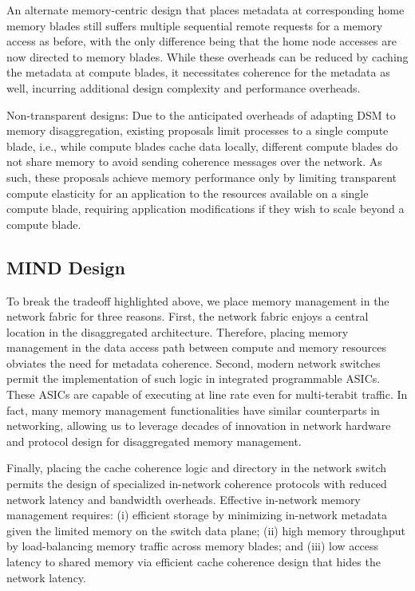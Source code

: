 An alternate memory-centric design that places metadata at corresponding home memory blades still suffers multiple sequential remote requests for a memory access as before, with the only difference being that the home node accesses are now directed to memory blades. While these overheads can be reduced by caching the metadata at compute blades, it necessitates coherence for the metadata as well, incurring additional design complexity and performance overheads.

Non-transparent designs: Due to the anticipated overheads of adapting DSM to memory disaggregation, existing proposals limit processes to a single compute blade, i.e., while compute blades cache data locally, different compute blades do not share memory to avoid sending coherence messages over the network. As such, these proposals achieve memory performance only by limiting transparent compute elasticity for an application to the resources available on a single compute blade, requiring application modifications if they wish to scale beyond a compute blade.

\subsection{MIND Design}
To break the tradeoff highlighted above, we place memory management in the network fabric for three reasons. First, the network fabric enjoys a central location in the disaggregated architecture. Therefore, placing memory management in the data access path between compute and memory resources obviates the need for metadata coherence. Second, modern network switches permit the implementation of such logic in integrated programmable ASICs. These ASICs are capable of executing at line rate even for multi-terabit traffic. In fact, many memory management functionalities have similar counterparts in networking, allowing us to leverage decades of innovation in network hardware and protocol design for disaggregated memory management.

Finally, placing the cache coherence logic and directory in the network switch permits the design of specialized in-network coherence protocols with reduced network latency and bandwidth overheads. Effective in-network memory management requires: (i) efficient storage by minimizing in-network metadata given the limited memory on the switch data plane; (ii) high memory throughput by load-balancing memory traffic across memory blades; and (iii) low access latency to shared memory via efficient cache coherence design that hides the network latency.

